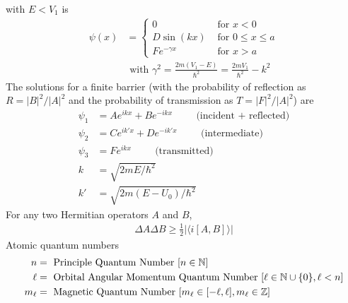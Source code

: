 with $E<V_1$ is
\begin{align}
	\psi(x) &=
	\begin{cases}
		0 & \textrm{ for } x<0 \\
		D\sin(kx) & \textrm{ for } 0 \leq x \leq a \\
		Fe^{-\gamma x} & \textrm{ for } x>a
	\end{cases} \\
	& \textrm{ with } \gamma^2=\frac{2m(V_1-E)}{\hbar^2}=\frac{2mV_1}{\hbar^2}-k^2
\end{align}
The solutions for a finite barrier (with the probability of reflection as $R=|B|^2/|A|^2$ and the probability of transmission as $T=|F|^2/|A|^2$) are
\begin{align}
	\psi_1&=Ae^{ikx}+Be^{-ikx} \hspace{1cm}\textrm{(incident + reflected)} \\
	\psi_2&=Ce^{ik'x}+De^{-ik'x} \hspace{1cm}\textrm{(intermediate)}\\
	\psi_3&=Fe^{ikx} \hspace{1cm}\textrm{(transmitted)} \\
	k&=\sqrt{2mE/\hbar^2}\\
	k'&=\sqrt{2m(E-U_0)/\hbar^2}
\end{align}
For any two Hermitian operators $A$ and $B$,
\begin{align}
	\Delta A \Delta B \geq \frac{1}{2}| \langle i [A, B] \rangle |
\end{align}
Atomic quantum numbers
\begin{align}
	n &= \textrm{ Principle Quantum Number } [n \in \mathbb{N}]\\
	\ell &= \textrm{ Orbital Angular Momentum Quantum Number } [\ell \in \mathbb{N}\cup\{0\}, \ell < n] \\
	m_\ell &= \textrm{ Magnetic Quantum Number }[m_\ell \in [-\ell, \ell], m_\ell \in \mathbb{Z}]
\end{align}
